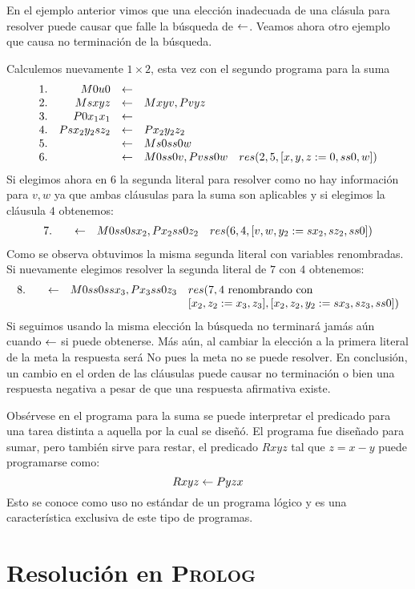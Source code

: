 \documentclass[11pt,letterpaper]{article}
\begin{document}
En el ejemplo anterior vimos que una elecci\'on inadecuada de una
cl\'asula para resolver puede causar que falle la b\'usqueda de
$\pmi$. Veamos ahora otro ejemplo que causa no terminaci\'on de la
b\'usqueda. 

\beje
Calculemos nuevamente $1\times 2$, esta vez con el segundo programa para la suma
\[
\ba{rrrll }
1. & M0u0 & \pmi   &\\
2. & Msxyz & \pmi & Mxyv, Pvyz &\\
3. & P0x_1x_1 & \pmi & & \\
4. & Psx_2y_2sz_2 & \pmi   & Px_2y_2z_2 &\\
5. & & \pmi & Ms0ss0w & \\
6. & & \pmi & M0ss0v, Pvss0w & res(2,5,[x,y,z:=0,ss0,w])
\ea
\]
Si elegimos ahora en $6$ la segunda literal para resolver como no hay
informaci\'on para $v,w$ ya que ambas cl\'ausulas para la suma son aplicables y
si elegimos la cl\'ausula $4$ obtenemos:
\[
\ba{rrrll}
7. & & \pmi & M0ss0sx_2, Px_2ss0z_2 & res(6,4,[v,w,y_2:=sx_2,sz_2,ss0])
\ea
\]
Como se observa obtuvimos la misma segunda literal con variables
renombradas. Si nuevamente elegimos resolver la segunda literal de $7$
con $4$ obtenemos:
\[
\ba{rrrll}
8. & & \pmi & M0ss0ssx_3, Px_3ss0z_3 & res(7,4\text{ renombrando con } \\
&&&&[x_2,z_2:=x_3,z_3],[x_2,z_2,y_2:=sx_3,sz_3,ss0])
\ea
\]
Si seguimos usando la misma elecci\'on la b\'usqueda no terminar\'a jam\'as 
a\'un cuando $\pmi$ si puede obtenerse. M\'as a\'un, al cambiar la elecci\'on a 
la primera literal de la meta la respuesta ser\'a No pues la meta no se
puede resolver. En conclusi\'on, un cambio en el orden de las cl\'ausulas
puede causar no terminaci\'on o bien una respuesta negativa a pesar de
que una respuesta afirmativa existe.
\eeje

\medskip

Obs\'ervese en el programa para la suma se puede interpretar el predicado 
para una tarea distinta a aquella por la cual se diseñ\'o. El programa
fue diseñado para sumar, pero tambi\'en sirve para restar, el predicado
$Rxyz$ tal que $z=x-y$  puede programarse como:
$$ Rxyz \pmi Pyzx $$
Esto se conoce como uso no est\'andar de un programa l\'ogico y es una
caracter\'istica exclusiva de este tipo de programas.


\section{Resoluci\'on en \textsc{Prolog}}
\end{document}
